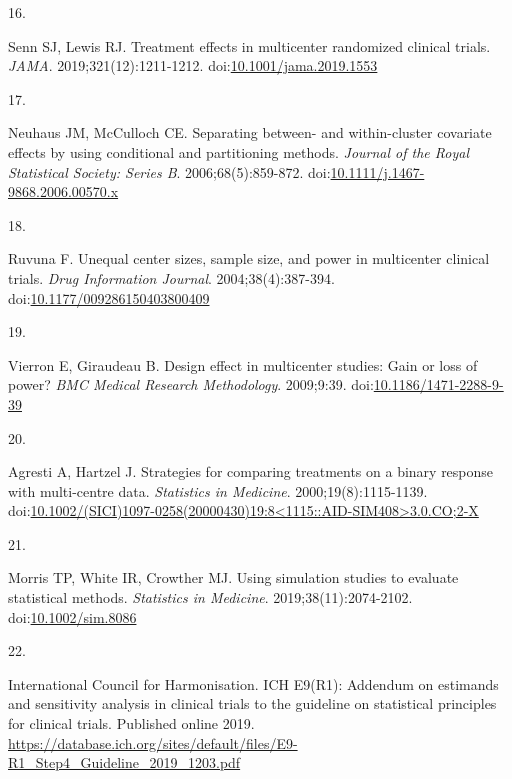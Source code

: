 \documentclass[
  11pt,
]{article}
\newlength{\cslhangindent}
\newlength{\csllabelwidth}
\newenvironment{CSLReferences}[2] %
 {\begin{list}{}{%
  \setlength{\itemindent}{0pt}
  \setlength{\leftmargin}{0pt}
  \setlength{\parsep}{0pt}
  \ifodd #1
   \setlength{\leftmargin}{\cslhangindent}
   \setlength{\itemindent}{-1\cslhangindent}
  \fi
  \setlength{\itemsep}{#2\baselineskip}}}
 {\end{list}}
\newcommand{\CSLLeftMargin}[1]{\parbox[t]{\csllabelwidth}{\strut#1\strut}}
\newcommand{\CSLRightInline}[1]{\parbox[t]{\linewidth - \csllabelwidth}{\strut#1\strut}}
\begin{document}
\begin{CSLReferences}{0}{1}
\CSLLeftMargin{16. }%
\CSLRightInline{Senn SJ, Lewis RJ. Treatment effects in multicenter randomized clinical trials. \emph{JAMA}. 2019;321(12):1211-1212. doi:\href{https://doi.org/10.1001/jama.2019.1553}{10.1001/jama.2019.1553}}

\CSLLeftMargin{17. }%
\CSLRightInline{Neuhaus JM, McCulloch CE. Separating between- and within-cluster covariate effects by using conditional and partitioning methods. \emph{Journal of the Royal Statistical Society: Series B}. 2006;68(5):859-872. doi:\href{https://doi.org/10.1111/j.1467-9868.2006.00570.x}{10.1111/j.1467-9868.2006.00570.x}}

\CSLLeftMargin{18. }%
\CSLRightInline{Ruvuna F. Unequal center sizes, sample size, and power in multicenter clinical trials. \emph{Drug Information Journal}. 2004;38(4):387-394. doi:\href{https://doi.org/10.1177/009286150403800409}{10.1177/009286150403800409}}

\CSLLeftMargin{19. }%
\CSLRightInline{Vierron E, Giraudeau B. Design effect in multicenter studies: Gain or loss of power? \emph{BMC Medical Research Methodology}. 2009;9:39. doi:\href{https://doi.org/10.1186/1471-2288-9-39}{10.1186/1471-2288-9-39}}

\CSLLeftMargin{20. }%
\CSLRightInline{Agresti A, Hartzel J. Strategies for comparing treatments on a binary response with multi-centre data. \emph{Statistics in Medicine}. 2000;19(8):1115-1139. doi:\href{https://doi.org/10.1002/(SICI)1097-0258(20000430)19:8\%3C1115::AID-SIM408\%3E3.0.CO;2-X}{10.1002/(SICI)1097-0258(20000430)19:8\textless1115::AID-SIM408\textgreater3.0.CO;2-X}}

\CSLLeftMargin{21. }%
\CSLRightInline{Morris TP, White IR, Crowther MJ. Using simulation studies to evaluate statistical methods. \emph{Statistics in Medicine}. 2019;38(11):2074-2102. doi:\href{https://doi.org/10.1002/sim.8086}{10.1002/sim.8086}}

\CSLLeftMargin{22. }%
\CSLRightInline{International Council for Harmonisation. ICH {E9(R1)}: Addendum on estimands and sensitivity analysis in clinical trials to the guideline on statistical principles for clinical trials. Published online 2019. \url{https://database.ich.org/sites/default/files/E9-R1_Step4_Guideline_2019_1203.pdf}}


\end{CSLReferences}
\end{document}
